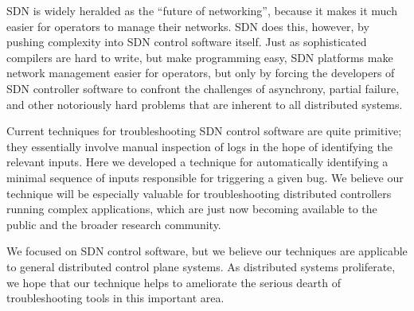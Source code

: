 
SDN is widely heralded as the ``future of networking'', because it makes it
much easier for operators to manage their networks. SDN does this, however, by
pushing complexity into SDN control software itself. Just as sophisticated
compilers are hard to write, but make programming easy, SDN platforms make
network management easier for operators, but only by forcing the developers of
SDN controller software to confront the challenges of asynchrony, partial failure, and
other notoriously hard problems that are inherent to all distributed systems.

Current techniques for troubleshooting SDN control software are quite primitive; they
essentially involve manual inspection of logs in the hope of identifying the
relevant inputs. Here we developed a technique for automatically
identifying a minimal sequence of inputs responsible for triggering a given
bug. We believe our technique will be especially valuable for troubleshooting
distributed controllers running complex applications, which are just now
becoming available to the public and the broader research community.

We focused on SDN control software, but we believe our techniques
are applicable to general distributed control plane systems. As distributed systems
proliferate, we hope that our technique helps to ameliorate the serious dearth of
troubleshooting tools in this important area.


